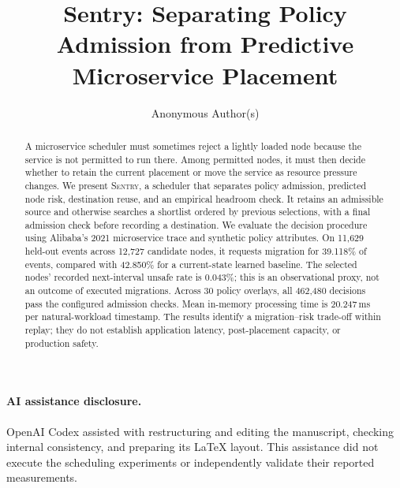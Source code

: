 \documentclass[sigplan,10pt,anonymous,nonacm]{acmart}
\title{Sentry: Separating Policy Admission from Predictive Microservice Placement}
\author{Anonymous Author(s)}
\newcommand{\cage}{\textsc{Sentry}\xspace}
\begin{document}
\begin{abstract}
A microservice scheduler must sometimes reject a lightly loaded node because
the service is not permitted to run there. Among permitted nodes, it must
then decide whether to retain the current placement or move the service as
resource pressure changes. We present \cage, a scheduler that separates
policy admission, predicted node risk, destination reuse, and an empirical
headroom check. It retains an admissible source and otherwise searches a
shortlist ordered by previous selections, with a final admission check
before recording a destination. We evaluate the decision procedure using
Alibaba's 2021 microservice trace and synthetic policy attributes. On
11,629 held-out events across 12,727 candidate nodes, it requests migration
for 39.118\% of events, compared with 42.850\% for a current-state learned
baseline. The selected nodes' recorded next-interval unsafe rate is
0.043\%; this is an observational proxy, not an outcome of executed
migrations. Across 30 policy overlays, all 462,480 decisions pass the
configured admission checks. Mean in-memory processing time is 20.247\,ms
per natural-workload timestamp. The results identify a migration--risk
trade-off within replay; they do not establish application latency,
post-placement capacity, or production safety.
\end{abstract}
\maketitle
\pagestyle{plain}








\paragraph{AI assistance disclosure.}
OpenAI Codex assisted with restructuring and editing the manuscript,
checking internal consistency, and preparing its LaTeX layout. This
assistance did not execute the scheduling experiments or independently
validate their reported measurements.


\end{document}
